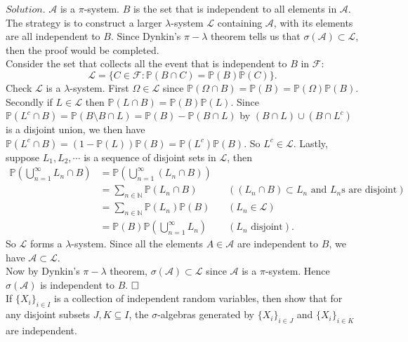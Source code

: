 \noindent$Solution.$
$\mathcal{A}$ is a $\pi$-system. $B$ is the set that is independent to all elements in $\mathcal{A}$. \\
The strategy is to construct a larger $\lambda$-system $\mathcal{L}$ containing $\mathcal{A}$, with its elements are all independent to $B$. Since Dynkin's $\pi-\lambda$ theorem tells us that $\sigma(\mathcal{A})\subset\mathcal{L}$, then the proof would be completed.\\
Consider the set that collects all the event that is independent to $B$ in $\mathcal{F}$:
\begin{equation*}
    \mathcal{L}=\{C\in\mathcal{F}:\mathbb{P}(B\cap C)=\mathbb{P}(B)\mathbb{P}(C)\}.
\end{equation*}
Check $\mathcal{L}$ is a $\lambda$-system. First $\Omega\in\mathcal{L}$ since $\mathbb{P}(\Omega\cap B)=\mathbb{P}(B)=\mathbb{P}(\Omega)\mathbb{P}(B)$. Secondly if $L\in\mathcal{L}$ then $\mathbb{P}(L\cap B) = \mathbb{P}(B)\mathbb{P}(L)$. Since $\mathbb{P}(L^c\cap B) = \mathbb{P}(B\setminus B\cap L)=\mathbb{P}(B)-\mathbb{P}(B\cap L)$ by $(B\cap L)\cup(B\cap L^c)$ is a disjoint union, we then have $\mathbb{P}(L^c\cap B) = (1-\mathbb{P}(L))\mathbb{P}(B)=\mathbb{P}(L^c)\mathbb{P}(B)$. So $L^c\in\mathcal{L}$. Lastly, suppose $L_1,L_2,\cdots$ is a sequence of disjoint sets in $\mathcal{L}$, then
\begin{align*}
\mathbb{P}\left(\bigcup^\infty_{n=1}L_n\cap B\right)&=\mathbb{P}\left(\bigcup^\infty_{n=1}(L_n\cap B)\right) \\
&=\sum_{n\in\mathbb{N}}\mathbb{P}(L_n\cap B) && (\text{$(L_n\cap B)\subset L_n$ and $L_n$s are disjoint}) \\
&=\sum_{n\in\mathbb{N}}\mathbb{P}(L_n)\mathbb{P}(B) && (L_n\in\mathcal{L}) \\
&=\mathbb{P}(B)\mathbb{P}\left(\bigcup^\infty_{n=1}L_n\right) && (L_n\text{  disjoint}).
\end{align*}
So $\mathcal{L}$ forms a $\lambda$-system. Since all the elements $A\in\mathcal{A}$ are independent to $B$, we have $\mathcal{A}\subset\mathcal{L}$.\\
Now by Dynkin's $\pi-\lambda$ theorem, $\sigma(\mathcal{A})\subset\mathcal{L}$ since $\mathcal{A}$ is a $\pi$-system. Hence $\sigma(\mathcal{A})$ is independent to $B$.
$\hspace{\fill}\square$\\

\label{7.1.10}
If $\{X_i\}_{i\in I}$ is a collection of independent random variables, then show that for any disjoint subsets $J, K \subseteq I$, the $\sigma$-algebras generated by
$\{X_i\}_{i\in J}$ and $\{X_i\}_{i\in K}$ are independent.\\

